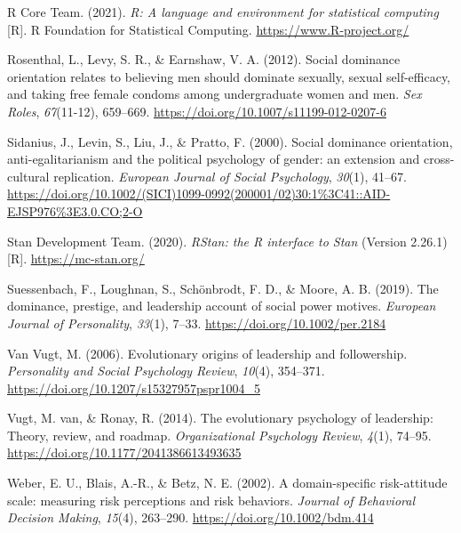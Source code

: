 \documentclass[
  english,
  ,doc, 12pt, a4paper,floatsintext]{apa7}
\newlength{\cslhangindent}
\newlength{\cslentryspacingunit} %
\newenvironment{CSLReferences}[2] %
 {%
  \setlength{\parindent}{0pt}
  \ifodd #1
  \let\oldpar\par
  \def\par{\hangindent=\cslhangindent\oldpar}
  \fi
  \setlength{\parskip}{#2\cslentryspacingunit}
 }%
 {}
\begin{document}
\begin{CSLReferences}{1}{0}
\leavevmode{}%
R Core Team. (2021). \emph{R: A language and environment for statistical computing} {[}R{]}. R Foundation for Statistical Computing. \url{https://www.R-project.org/}

\leavevmode{}%
Rosenthal, L., Levy, S. R., \& Earnshaw, V. A. (2012). Social dominance orientation relates to believing men should dominate sexually, sexual self-efficacy, and taking free female condoms among undergraduate women and men. \emph{Sex Roles}, \emph{67}(11-12), 659--669. \url{https://doi.org/10.1007/s11199-012-0207-6}

\leavevmode{}%
Sidanius, J., Levin, S., Liu, J., \& Pratto, F. (2000). Social dominance orientation, anti-egalitarianism and the political psychology of gender: an extension and cross-cultural replication. \emph{European Journal of Social Psychology}, \emph{30}(1), 41--67. \url{https://doi.org/10.1002/(SICI)1099-0992(200001/02)30:1\%3C41::AID-EJSP976\%3E3.0.CO;2-O}

\leavevmode{}%
Stan Development Team. (2020). \emph{RStan: the R interface to Stan} (Version 2.26.1) {[}R{]}. \url{https://mc-stan.org/}

\leavevmode{}%
Suessenbach, F., Loughnan, S., Schönbrodt, F. D., \& Moore, A. B. (2019). The dominance, prestige, and leadership account of social power motives. \emph{European Journal of Personality}, \emph{33}(1), 7--33. \url{https://doi.org/10.1002/per.2184}

\leavevmode{}%
Van Vugt, M. (2006). Evolutionary origins of leadership and followership. \emph{Personality and Social Psychology Review}, \emph{10}(4), 354--371. \url{https://doi.org/10.1207/s15327957pspr1004_5}

\leavevmode{}%
Vugt, M. van, \& Ronay, R. (2014). The evolutionary psychology of leadership: Theory, review, and roadmap. \emph{Organizational Psychology Review}, \emph{4}(1), 74--95. \url{https://doi.org/10.1177/2041386613493635}

\leavevmode{}%
Weber, E. U., Blais, A.-R., \& Betz, N. E. (2002). A domain-specific risk-attitude scale: measuring risk perceptions and risk behaviors. \emph{Journal of Behavioral Decision Making}, \emph{15}(4), 263--290. \url{https://doi.org/10.1002/bdm.414}


\end{CSLReferences}
\end{document}
